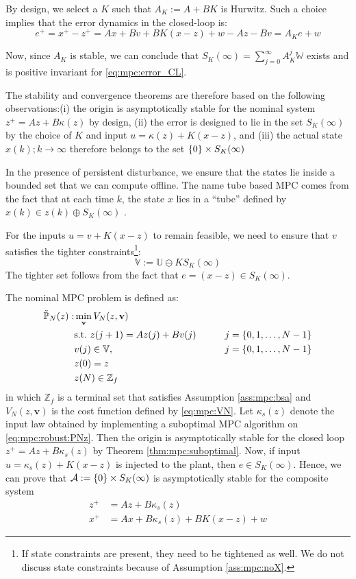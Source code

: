 By design, we select a $K$ such that $A_K:=A+BK$ is Hurwitz. Such a choice
implies that the error dynamics in the closed-loop is:
\begin{equation}
\label{eq:mpc:error_CL}
e^+ = x^+-z^+=Ax+Bv+BK(x-z)+w-Az-Bv = A_Ke+w
\end{equation}

Now, since $A_K$ is stable, we can conclude that $S_K(\infty) =
\sum_{j=0}^{\infty}A_K^j\mathbb{W}$ exists and is positive invariant
for \eqref{eq:mpc:error_CL}.

The stability and convergence theorems are therefore based on the
following observations:(i) the origin is asymptotically stable for the
nominal system $z^+= Az+B\kappa(z)$ by design, (ii) the error is designed to lie in the set
$S_K(\infty)$ by the   choice of $K$ and input $u = \kappa(z) +
K(x-z)$, and (iii) the actual state $x(k); k \rightarrow \infty$
therefore belongs to the set   $\left\lbrace 0 \right\rbrace \times S_K(\infty)$

In the presence of persistent disturbance, we ensure that the states
lie inside a bounded set that we can compute offline. The name tube
based MPC comes from the fact that at each time $k$, the state $x$
lies in a ``tube'' defined by $x(k) \in z(k)\oplus S_K(\infty)$
.  

For the inputs $u = v+K(x-z)$ to remain feasible, we need to ensure
that $v$ satisfies the tighter constraints\footnote{If state constraints are present, they need to be tightened
  as well. We do not discuss state constraints because of Assumption \ref{ass:mpc:noX}.}:
\begin{equation}
\mathbb{V} := \mathbb{U} \ominus KS_K(\infty)
\end{equation}
The tighter set follows from the fact that $e = (x-z) \in
S_K(\infty)$. 

The nominal MPC problem is defined as:
\begin{align}
\tilde{\mathbb{P}}_N(z): & \min_{\mathbf{v}}V_N(z,\mathbf{v}) \nonumber \\
& \text{s.t.~} z(j+1) = Az(j) + Bv(j)&  j = \left\lbrace 0,1,\ldots,N-1 \right\rbrace\nonumber\\
& v(j) \in \mathbb{V} \label{eq:mpc:robust:PNz},
& \qquad   j = \left\lbrace 0,1,\ldots,N-1 \right\rbrace\\
&z(0) = z \nonumber \\
& z(N) \in \mathbb{Z}_f \nonumber
\end{align}
in which $\mathbb{Z}_f$ is a terminal set that satisfies Assumption
\ref{ass:mpc:bsa} and $V_N(z,\mathbf{v})$ is the cost function defined by
\eqref{eq:mpc:VN}. Let $\kappa_s(z)$ denote the input law obtained by
implementing a suboptimal MPC algorithm on \eqref{eq:mpc:robust:PNz}. Then the
origin is asymptotically stable for the closed loop $z^+ = Az+
B\kappa_s(z)$ by Theorem \ref{thm:mpc:suboptimal}. Now, if input $u =
\kappa_s(z) + K(x-z)$ is injected to the plant, then $e \in
S_K(\infty)$. Hence, we can prove that $\mathcal{A}: = \left\lbrace 0 \right\rbrace \times
S_K(\infty)$ is asymptotically stable for the composite system 
\begin{align}
z^+ &= Az + B\kappa_s(z)\\
x^+ &= Ax + B\kappa_s(z) + BK(x-z) + w 
\end{align}

